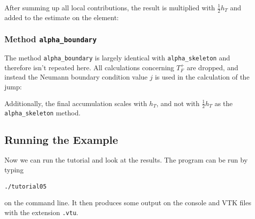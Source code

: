\documentclass[a4paper,12pt]{article}
\begin{document}
After summing up all local contributions, the result is multiplied with
$\frac{1}{2} h_T$ and added to the estimate on the element:


\subsubsection*{Method \lstinline{alpha_boundary}}

The method \lstinline{alpha_boundary} is largely identical with
\lstinline{alpha_skeleton} and therefore isn't repeated here. All calculations
concerning $T_F^+$ are dropped, and instead the Neumann boundary condition
value $j$ is used in the calculation of the jump:


Additionally, the final accumulation scales with $h_T$, and not with
$\frac{1}{2} h_T$ as the \lstinline{alpha_skeleton} method.

\subsection{Running the Example}

Now we can run the tutorial and look at the results.
The program can be run by typing

\begin{lstlisting}[basicstyle=\ttfamily\small,
frame=single,
backgroundcolor=\color{listingbg}]
./tutorial05
\end{lstlisting}
on the command line. It then produces some output on the console
and VTK files with the extension \lstinline{.vtu}.
\end{document}
